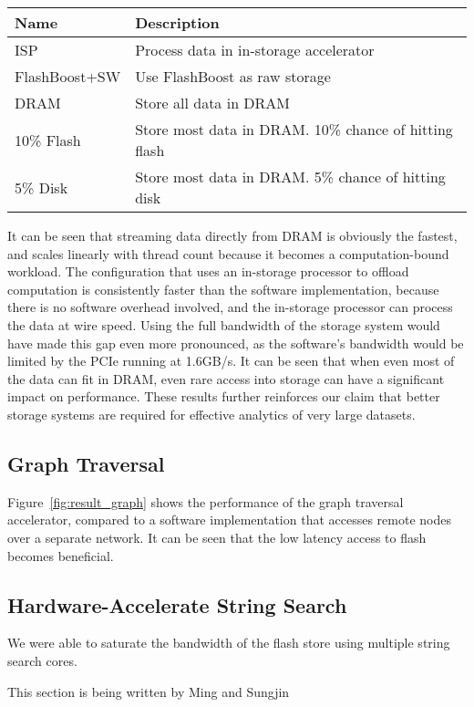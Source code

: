 \begin{tabular}{l | p{0.25\paperwidth}}
\label{tab:nearest_neighbor}
Name & Description \\
\hline \hline
ISP & Process data in in-storage accelerator \\
FlashBoost+SW & Use FlashBoost as raw storage \\
DRAM & Store all data in DRAM \\
10\% Flash & Store most data in DRAM. 10\% chance of hitting flash \\
5\% Disk & Store most data in DRAM. 5\% chance of hitting disk \\
\hline
\end{tabular}

It can be seen that streaming data directly from DRAM is obviously the fastest, and
scales linearly with thread count because it becomes a computation-bound
workload. The configuration that uses an in-storage processor to offload
computation is consistently faster than the software implementation, because
there is no software overhead involved, and the in-storage processor can process
the data at wire speed. Using the full bandwidth of the storage system would
have made this gap even more pronounced, as the software's bandwidth would be
limited by the PCIe running at 1.6GB/s. It can be seen that when even most of
the data can fit in DRAM, even rare access into storage can have a significant
impact on performance. These results further reinforces our claim that better
storage systems are required for effective analytics of very large datasets.


\subsection{Graph Traversal}

Figure~\ref{fig:result_graph} shows the performance of the graph traversal
accelerator, compared to a software implementation that accesses remote nodes
over a separate network. It can be seen that the low latency access to flash
becomes beneficial.




\subsection{Hardware-Accelerate String Search}

We were able to saturate the bandwidth of the flash store using multiple string
search cores.

This section is being written by Ming and Sungjin

